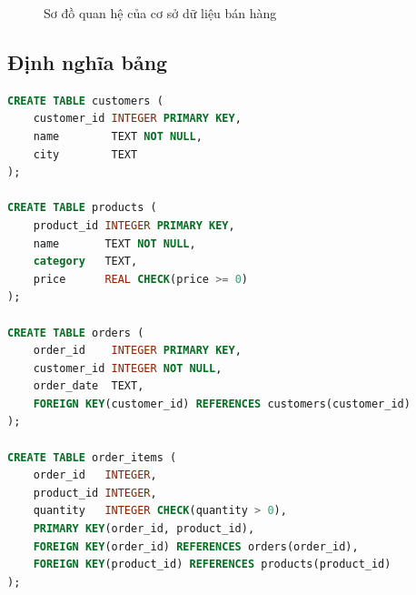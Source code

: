 \documentclass[12pt,a4paper]{article}
\newcommand{\code}[1]{\texttt{\small #1}}
\begin{document}
\begin{figure}[H]
\centering
{}
\caption{Sơ đồ quan hệ của cơ sở dữ liệu bán hàng}
\label{fig:erd}
\end{figure}

\subsection{Định nghĩa bảng}

\begin{lstlisting}[language=SQL,caption={Trích \code{sql/schema.sql}: bốn bảng và các ràng buộc}]
CREATE TABLE customers (
    customer_id INTEGER PRIMARY KEY,
    name        TEXT NOT NULL,
    city        TEXT
);

CREATE TABLE products (
    product_id INTEGER PRIMARY KEY,
    name       TEXT NOT NULL,
    category   TEXT,
    price      REAL CHECK(price >= 0)
);

CREATE TABLE orders (
    order_id    INTEGER PRIMARY KEY,
    customer_id INTEGER NOT NULL,
    order_date  TEXT,
    FOREIGN KEY(customer_id) REFERENCES customers(customer_id)
);

CREATE TABLE order_items (
    order_id   INTEGER,
    product_id INTEGER,
    quantity   INTEGER CHECK(quantity > 0),
    PRIMARY KEY(order_id, product_id),
    FOREIGN KEY(order_id) REFERENCES orders(order_id),
    FOREIGN KEY(product_id) REFERENCES products(product_id)
);
\end{lstlisting}
\end{document}
